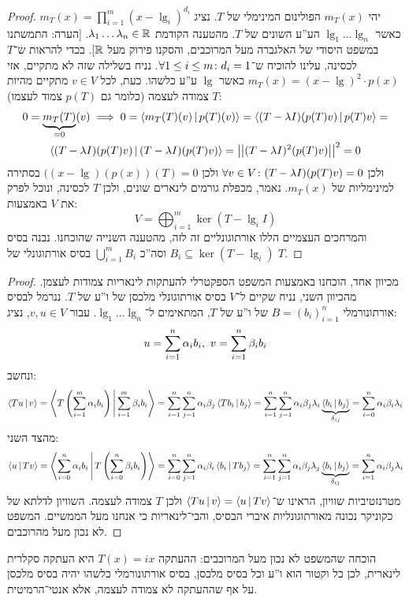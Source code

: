 \documentclass[]{../../../../tex/classes/styledArticle}
\begin{document}
	 \begin{proof}
		יהי $m_T(x)$ הפולינום המינימלי של $T$. נציג $m_T(x) = \prod_{i = 1}^{m}(x - \lg_i)^{d_i}$ כאשר $\lg_1 \dots \lg_n$ הע''ע השונים של $T$. מהטענה הקודמת $\lambda_1 \dots \lambda_n \in \mathbb{R}$. [הערה: התמשתנו במשפט היסודי של האלגברה מעל המרוכבים, והסקנו פירוק מעל $\mathbb{R}$]. בכדי להראות ש־$T$ לכסינה, עלינו להוכיח ש־$\forall 1 \le i \le m \colon d_i = 1$. נניח בשלילה שזה לא מתקיים, אזי $m_T(x) = (x - \lg)^2 \cdot p(x)$ כאשר $\lg$ ע''ע כלשהו. כעת, לכל $v \in V$ מתקיים מהיות $T$ צמודה לעצמה (כלומר גם $p(T)$ צמוד לעצמו): 
		\begin{multline*}
			0 = \underbrace{m_T(T)}_{=0}(v) \implies 0 = \left \langle m_T(T)(v) \,\middle|\, p(T)(v) \right \rangle = \left \langle (T - \lambda I)(p(T)v) \,\middle|\, p(T)v \right \rangle =\\ \left \langle (T - \lambda I)(p(T)v) \,\middle|\, (T - \lambda I)(p(T)v) \right \rangle = \left \vert \left \vert (T - \lambda I)^2(p(T)v) \right \vert \right \vert^2 = 0
		\end{multline*}
		ולכן $\forall v \in V \colon (T - \lambda I)(p(T)v) = 0$ ולכן $((x - \lg)(p(x))(T) = 0$ בסתירה למינימליות של $m_T(x)$. נאמר, מכפלת גורמים לינארים שונים, ולכן $T$ לכסינה, ונוכל לפרק את $V$ באמצעות: 
		\[ V = \bigoplus_{i = 1}^{m} \ker (T - \lg_i I) \]
		והמרחכים העצמיים הללו אורתוגונליים זה לזה, מהטענה השנייה שהוכחנו. 
		נבנה בסיס $B_i \subseteq \ker (T - \lg_i)$ וסה''כ $\bigcup_{i = 1}^{m} B_i$ בסיס אורתוגונלי של $T$. 
	\end{proof}
	\begin{proof}
		מכיוון אחד, הוכחנו באמצעות המשפט הספקטרלי להעתקות לינאריות צמודות לעצמן. 
		מהכיוון השני, נניח שקיים ל־$V$ בסיס אורתוגונלי מלכסן של ו''ע של $T$. ננרמל לבסיס אורתונורמלי $B = (b_i)_{i = 1}^{n}$ של ו''ע של $T$, המתאימים ל־$\lg_1 \dots \lg_n$. עבור $v, u \in V$, נציג: 
		\[ u = \sum_{i = 1}^{n}\alpha_i b_i, \ v = \sum_{i = 1}^{n}\beta_i b_i \]
		ונחשב: 
		\[ \left \langle Tu \,\middle|\, v \right \rangle = \left \langle T\left ( \sum_{i = 1}^{m}\alpha_i b_i \right ) \,\middle|\, \sum_{i = 1}^{m}\beta_i b_i \right \rangle = \sum_{i = 1}^{n}\sum_{j = 1}^{n}\alpha_i \beta_j \left \langle T b_i \,\middle|\, b_j \right \rangle = \sum_{i = 1}^{n}\sum_{j = 1}^{n}\alpha_i \beta_j \lambda_i \underbrace{\left \langle b_i \,\middle|\, b_j \right \rangle}_{\delta_{ij}} = \sum_{i = 0}^{n} \alpha_i \beta_i \lambda_i \]
		מהצד השני: 
		\[ \left \langle u \,\middle|\, Tv \right \rangle = \left \langle \sum_{i = 0}^{n} \alpha_i b_i \,\middle|\, T\left ( \sum_{i = 0}^{n} \beta_i b_i \right ) \right \rangle = \sum_{i = 0}^{n} \sum_{j = 1}^{n}\alpha_i \beta_i \left \langle b_i \,\middle|\, Tb_j \right \rangle = \sum_{i = 1}^{n}\sum_{j = 1}^{n}\alpha_i \beta_j \lambda_j \underbrace{\left \langle b_i \,\middle|\, b_j \right \rangle}_{\delta_{ij}} = \sum_{i = 1}^{n}\alpha_i \beta_j \lambda_i \]
		מטרנזטיביות שוויון, הראינו ש־$\left \langle Tu \,\middle|\, v \right \rangle = \left \langle u \,\middle|\, Tv \right \rangle$ ולכן $T$ צמודה לעצמה. השוויון לדלתא של כקוניקר נכונה מאורתוגונליות איברי הבסיס, והבי־לינאריות כי אנחנו מעל הממשיים. המשפט לא נכון מעל מהרוכבים. 
	\end{proof}
	הוכחה שהמשפט לא נכון מעל המרוכבים: ההעתקה $T(x) = ix$ היא העתקה סקלרית לינארית, לכן כל וקטור הוא ו''ע וכל בסיס מלכסן, בסיס אורתונורמלי כלשהו יהיה בסיס מלכסן על אף שההעתקה לא צמודה לעצמה, אלא אנטי־הרמיטית. 
	
\end{document}
